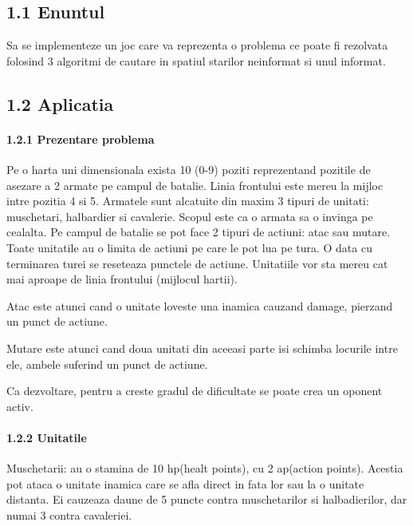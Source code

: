 \documentclass{article} %
\begin{document}
\noindent 

\noindent 
\subsection{1.1 Enuntul}

\noindent 

\noindent Sa se implementeze un joc care va reprezenta o problema ce poate fi rezolvata folosind 3 algoritmi de cautare in spatiul starilor neinformat si unul informat.

\noindent 

\noindent 
\subsection{1.2 Aplicatia}

\noindent 

\noindent 
\paragraph{1.2.1 Prezentare problema}

\noindent Pe o harta uni dimensionala exista 10 (0-9) poziti reprezentand pozitile de asezare a 2 armate pe campul de batalie. Linia frontului este mereu la mijloc intre pozitia 4 si 5. Armatele sunt alcatuite din maxim 3 tipuri de unitati: muschetari, halbardier si cavalerie. Scopul este ca o armata sa o invinga pe cealalta. Pe campul de batalie se pot face 2 tipuri de actiuni: atac sau mutare. Toate unitatile au o limita de actiuni pe care le pot lua pe tura. O data cu terminarea turei se reseteaza punctele de actiune. Unitatiile vor sta mereu cat mai aproape de linia frontului (mijlocul hartii).

\noindent Atac este atunci cand o unitate loveste una inamica cauzand damage, pierzand un punct de actiune.

\noindent Mutare este atunci cand doua unitati din aceeasi parte isi schimba locurile intre ele,  ambele suferind un punct de actiune.

\noindent Ca dezvoltare, pentru a creste gradul de dificultate se poate crea un oponent activ.

\noindent 
\paragraph{1.2.2 Unitatile}

\noindent Muschetarii: au o stamina de 10 hp(healt points), cu 2 ap(action points). Acestia pot ataca o unitate inamica care se afla direct in fata lor sau la o unitate distanta. Ei cauzeaza daune de 5 puncte contra muschetarilor si halbadierilor, dar numai 3 contra cavaleriei.
\end{document}
